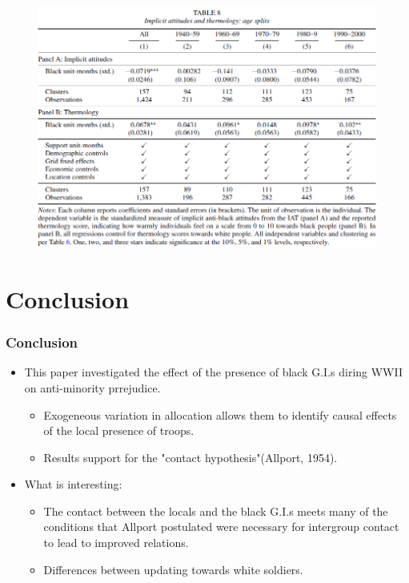 \documentclass[dvipdfmx,11pt]{beamer}
\begin{document}
\begin{frame}\frametitle{}
  \begin{figure}
    \centering
    \includegraphics[scale = .6]{os1027tanji/T8}
  \end{figure}
\end{frame}

\section{Conclusion}
\frame{\sectionpage}
\begin{frame}\frametitle{Conclusion}
  \begin{itemize}
    \item This paper investigated the effect of the presence of black G.I.s diring WWII on anti-minority prrejudice.
    \begin{itemize}
      \item Exogeneous variation in allocation allows them to identify causal effects of the local presence of troops.
      \item Results support for the "contact hypothesis"(Allport, 1954).
    \end{itemize}
    \item What is interesting:
    \begin{itemize}
      \item The contact between the locals and the black G.I.s meets many of the conditions that Allport postulated were necessary for intergroup contact to lead to improved relations.
      \item Differences between updating towards white soldiers.
    \end{itemize}
  \end{itemize}
\end{frame}
\end{document}
